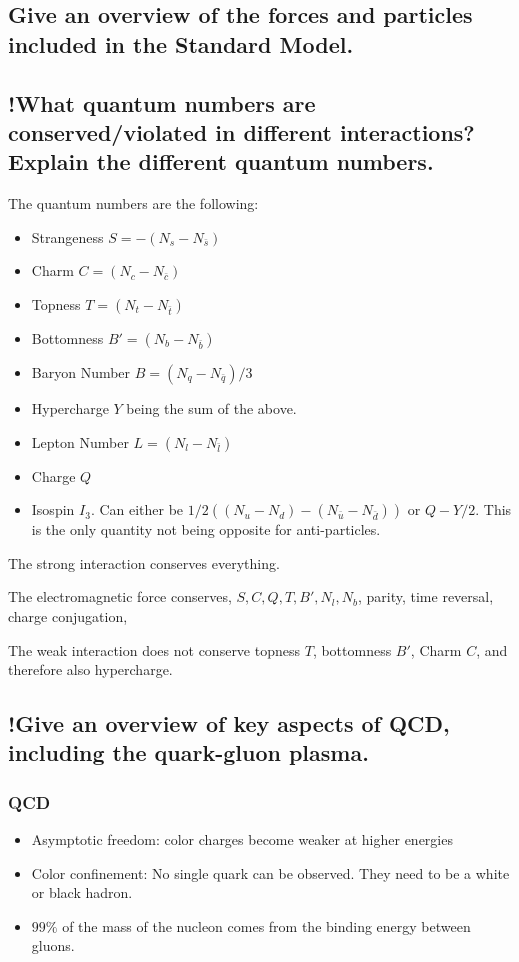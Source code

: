 \documentclass{article}
\begin{document}
\subsection{Give an overview of the forces and particles included in the Standard Model.}



\subsection{!What quantum numbers are conserved/violated in different interactions? Explain the different quantum numbers.}
The quantum numbers are the following: 
\begin{itemize}
    \item Strangeness $S = - (N_s - N_{\bar{s}})$ 
    \item Charm $C = (N_c - N_{\bar{c}})$
    \item Topness $T = (N_t - N_{\bar{t}})$
    \item Bottomness $B' = (N_b - N_{\bar{b}})$
    \item Baryon Number $B = (N_q - N_{\bar{q}})/3 $
    \item Hypercharge $Y$ being the sum of the above. 
    \item Lepton Number $L = (N_l - N_{\bar{l}})$
    \item Charge $Q$ 
    \item Isospin $I_3$. Can either be $1/2((N_u-N_d) - (N_{\bar{u}} - N_{\bar{d}}))$ or $Q - Y/2$. This is the only quantity not being opposite for anti-particles. 
\end{itemize}
The strong interaction conserves everything. 

The electromagnetic force conserves, $S, C, Q, T, B', N_l, N_b$, parity, time reversal, charge conjugation, 

The weak interaction does not conserve topness $T$, bottomness $B'$, Charm $C$, and therefore also hypercharge. 


\subsection{!Give an overview of key aspects of QCD, including the quark-gluon plasma.}
\subsubsection{QCD}
\begin{itemize}
    \item Asymptotic freedom: color charges become weaker at higher energies
    \item Color confinement: No single quark can be observed. They need to be a white or black hadron. 
    \item $99\%$ of the mass of the nucleon comes from the binding energy between gluons. 
\end{itemize}
\end{document}

